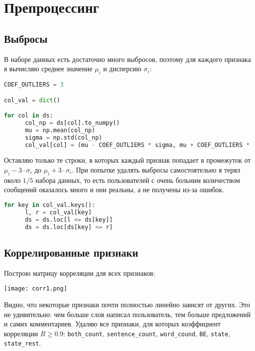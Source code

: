 \section{Препроцессинг}
\subsection{Выбросы}
В наборе данных есть достаточно много выбросов, поэтому для каждого признака я вычисляю среднее значение ${\mu}_i$ и дисперсию ${\sigma}_i$:
\begin{lstlisting}[language=python, keepspaces=true]
COEF_OUTLIERS = 3

col_val = dict()

for col in ds:
      col_np = ds[col].to_numpy()
      mu = np.mean(col_np)
      sigma = np.std(col_np)
      col_val[col] = (mu - COEF_OUTLIERS * sigma, mu + COEF_OUTLIERS * sigma)
\end{lstlisting}
Оставляю только те строки, в которых каждый признак попадает в промежуток от ${\mu}_i - 3 \cdot {\sigma}_i$ до ${\mu}_i + 3 \cdot {\sigma}_i$. При попытке удалять выбросы самостоятельно я терял около $1/5$ набора данных, то есть пользователей с очень больним количеством сообщений оказалось много и они реальны, а не получены из-за ошибок.
\begin{lstlisting}[language=python, keepspaces=true]
for key in col_val.keys():
      l, r = col_val[key]
      ds = ds.loc[l <= ds[key]]
      ds = ds.loc[ds[key] <= r]
\end{lstlisting}
\pagebreak

\subsection{Коррелированные признаки}
Построю матрицу корреляции для всех признаков:
\begin{center}
      \texttt{[image: corr1.png]}\newline\noindent
\end{center}
Видно, что некоторые признаки почти полностью линейно зависят от других. Это не удивительно: чем больше слов написал пользователь, тем больше предложений и самих комментариев. Удаляю все признаки, для которых коэффициент корреляции $R \ge 0.9$: \texttt{both\_count}, \texttt{sentence\_count}, \texttt{word\_cound}, \texttt{BE}, \texttt{state}, \texttt{state\_rest}.
\pagebreak

